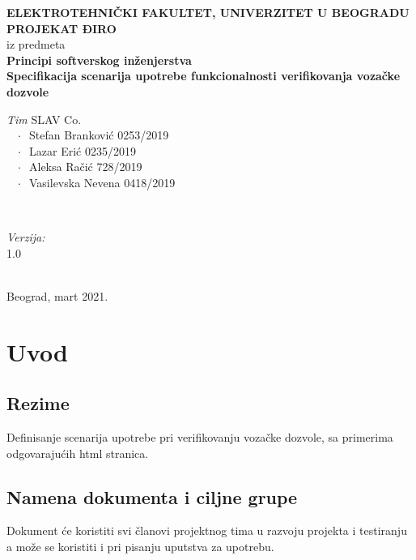 \documentclass[12pt]{article}
\begin{document}
    \renewcommand{\labelenumii}{\arabic{enumi}.\arabic{enumii}}
	\begin{titlepage}  
		\center
		\textbf{ \LARGE ELEKTROTEHNIČKI FAKULTET, UNIVERZITET U BEOGRADU } \\[4cm]
		\textbf{ \Large PROJEKAT ĐIRO\texttrademark} \\[0.3cm]
		iz predmeta \\[0.3cm]
		\textbf{ \Large Principi softverskog inženjerstva} \\[0.7cm]
		{ \huge \bfseries Specifikacija scenarija upotrebe funkcionalnosti verifikovanja vozačke dozvole } \\[5.5cm]
		

		\begin{minipage}{0.5\textwidth}
			\begin{flushleft}
				\large
				\emph{Tim} SLAV Co. \\
			     $\;\;\; \cdot \;\;$Stefan Branković  0253/2019\\
			     $\;\;\; \cdot \;\;$Lazar Erić 0235/2019\\
			     $\;\;\; \cdot \;\;$Aleksa Račić 728/2019\\
			     $\;\;\; \cdot \;\;$Vasilevska Nevena 0418/2019
			\end{flushleft}
		\end{minipage}
		~
		\begin{minipage}{0.4\textwidth}
			\begin{flushright}
				\large
				\emph{Verzija:} \\
				1.0
			\end{flushright}
		\end{minipage} \\[2cm]
		\enlargethispage{4\baselineskip}
		{ \large Beograd, mart 2021. }
		\vfill
	\end{titlepage}
\pagebreak
\tableofcontents
\pagebreak



\section{Uvod}
\subsection{Rezime}
Definisanje scenarija upotrebe pri verifikovanju vozačke dozvole, sa primerima odgovarajućih html stranica.
\subsection{Namena dokumenta i ciljne grupe}
Dokument će koristiti svi članovi projektnog tima u razvoju projekta i testiranju a može se koristiti i pri pisanju uputstva za
upotrebu.
\end{document}
